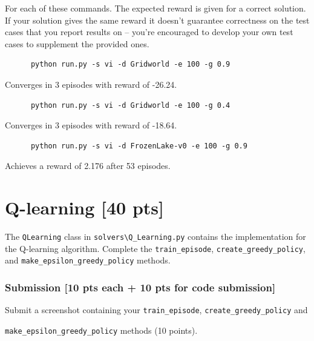 \documentclass[a4paper]{article}
\theoremstyle{definition}
\begin{document}
For each of these commands. The expected reward is given for a correct solution.
If your solution gives the same reward it doesn't guarantee correctness on the test cases that you report results on -- you're encouraged to develop your own test cases to supplement the provided ones.

\begin{verbatim}
      python run.py -s vi -d Gridworld -e 100 -g 0.9  
\end{verbatim}
Converges in 3 episodes with reward of -26.24.

\begin{verbatim}
      python run.py -s vi -d Gridworld -e 100 -g 0.4  
\end{verbatim}
Converges in 3 episodes with reward of -18.64.

\begin{verbatim}
      python run.py -s vi -d FrozenLake-v0 -e 100 -g 0.9  
\end{verbatim}
Achieves a reward of 2.176 after 53 episodes.

\pagebreak
\section{Q-learning [40 pts]}

The \verb|QLearning| class in \verb|solvers\Q_Learning.py| contains the implementation for the Q-learning algorithm. Complete the \verb|train_episode|, \verb|create_greedy_policy|,  and \verb|make_epsilon_greedy_policy| methods.

\subsubsection*{Submission [10 pts each + 10 pts for code submission]}

Submit a screenshot containing your \verb|train_episode|, \verb|create_greedy_policy| and

\verb|make_epsilon_greedy_policy| methods (10 points).
\end{document}
